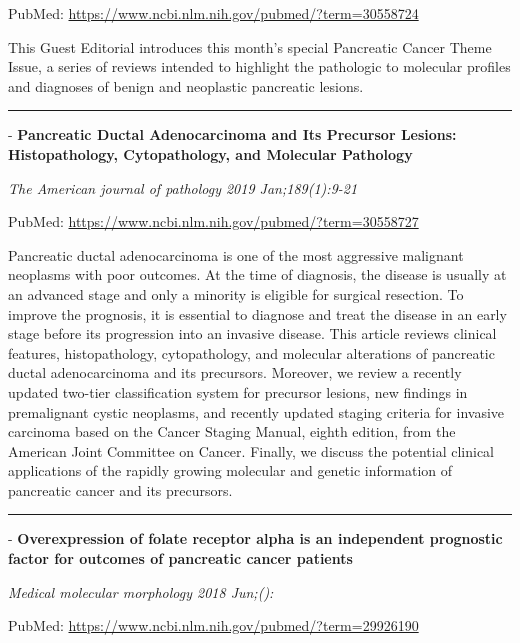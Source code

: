 \documentclass[]{article}
\begin{document}
PubMed: \url{https://www.ncbi.nlm.nih.gov/pubmed/?term=30558724}

This Guest Editorial introduces this month's special Pancreatic Cancer
Theme Issue, a series of reviews intended to highlight the pathologic to
molecular profiles and diagnoses of benign and neoplastic pancreatic
lesions.

{}

{}

\begin{center}\rule{0.5\linewidth}{\linethickness}\end{center}

 - \textbf{Pancreatic Ductal Adenocarcinoma and Its Precursor Lesions:
Histopathology, Cytopathology, and Molecular Pathology}

\emph{The American journal of pathology 2019 Jan;189(1):9-21}

PubMed: \url{https://www.ncbi.nlm.nih.gov/pubmed/?term=30558727}

Pancreatic ductal adenocarcinoma is one of the most aggressive malignant
neoplasms with poor outcomes. At the time of diagnosis, the disease is
usually at an advanced stage and only a minority is eligible for
surgical resection. To improve the prognosis, it is essential to
diagnose and treat the disease in an early stage before its progression
into an invasive disease. This article reviews clinical features,
histopathology, cytopathology, and molecular alterations of pancreatic
ductal adenocarcinoma and its precursors. Moreover, we review a recently
updated two-tier classification system for precursor lesions, new
findings in premalignant cystic neoplasms, and recently updated staging
criteria for invasive carcinoma based on the Cancer Staging Manual,
eighth edition, from the American Joint Committee on Cancer. Finally, we
discuss the potential clinical applications of the rapidly growing
molecular and genetic information of pancreatic cancer and its
precursors.

{}

{}

\begin{center}\rule{0.5\linewidth}{\linethickness}\end{center}

 - \textbf{Overexpression of folate receptor alpha is an independent
prognostic factor for outcomes of pancreatic cancer patients}

\emph{Medical molecular morphology 2018 Jun;():}

PubMed: \url{https://www.ncbi.nlm.nih.gov/pubmed/?term=29926190}
\end{document}
